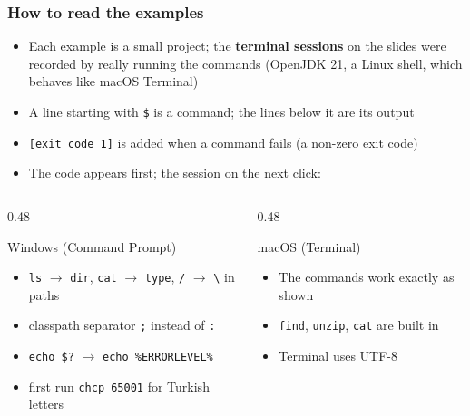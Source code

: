 \documentclass[aspectratio=169,10pt,compress]{beamer}
\newcommand{\cmd}[1]{\texttt{\color{gitred}#1}}
\begin{document}
\begin{frame}[t,fragile] \frametitle{How to read the examples}
  \begin{itemize}\small
    \item Each example is a small project; the \textbf{terminal sessions} on the slides were recorded by
          really running the commands (OpenJDK 21, a Linux shell, which behaves like macOS Terminal)
    \item A line starting with \texttt{\$} is a command; the lines below it are its output
    \item \texttt{[exit code 1]} is added when a command fails (a non-zero exit code)
    \item The code appears first; the session on the next click: 
  \end{itemize}
  \vspace{0.3em}
  \begin{columns}[T]
    \begin{column}{0.48\textwidth}
      \begin{block}{Windows (Command Prompt)}
        \footnotesize
        \begin{itemize}
          \item \texttt{ls} $\to$ \texttt{dir}, \texttt{cat} $\to$ \texttt{type}, \texttt{/} $\to$ \texttt{\textbackslash} in paths
          \item classpath separator \texttt{;} instead of \texttt{:}
          \item \texttt{echo \$?} $\to$ \texttt{echo \%ERRORLEVEL\%}
          \item first run \cmd{chcp 65001} for Turkish letters
        \end{itemize}
      \end{block}
    \end{column}
    \begin{column}{0.48\textwidth}
      \begin{block}{macOS (Terminal)}
        \footnotesize
        \begin{itemize}
          \item The commands work exactly as shown
          \item \texttt{find}, \texttt{unzip}, \texttt{cat} are built in
          \item Terminal uses UTF-8
        \end{itemize}
      \end{block}
    \end{column}
  \end{columns}
\end{frame}
\end{document}
